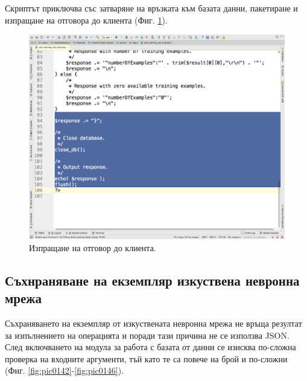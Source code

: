 \documentclass[book,14pt,oneside,openany]{memoir}
\begin{document}
Скриптът приключва със затваряне на връзката към базата данни, пакетиране и изпращане на отговора до клиента (Фиг. \ref{fig:pic0141}).

\begin{figure}[h]
  \centering
  \includegraphics[height=0.45\pdfpageheight]{pic0141}
  \caption{Изпращане на отговор до клиента.}
\label{fig:pic0141}
\end{figure}
\FloatBarrier

\subsection{Съхнраняване на екземпляр изкуствена невронна мрежа}

Съхраняването на екземпляр от изкуствената невронна мрежа не връща резултат за изпълнението на операцията и поради тази причина не се използва JSON. След включването на модула за работа с базата от данни се изисква по-сложна проверка на входните аргументи, тъй като те са повече на брой и по-сложни (Фиг. \ref{fig:pic0142}-\ref{fig:pic0146}). 
\end{document}

